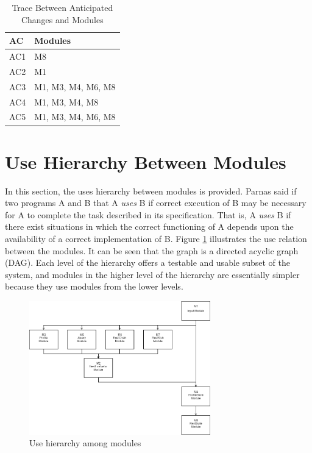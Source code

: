 \documentclass[12pt, titlepage]{article}
\begin{document}
\begin{table}[H]
\centering
\begin{tabular}{p{} p{}}
\toprule
\textbf{AC} & \textbf{Modules}\\
\midrule
AC1 & M8\\
AC2 & M1\\
AC3 & M1, M3, M4, M6, M8\\
AC4 & M1, M3, M4, M8\\
AC5 & M1, M3, M4, M6, M8\\

\bottomrule
\end{tabular}
\caption{Trace Between Anticipated Changes and Modules}
\label{TblACT}
\end{table}


\section{Use Hierarchy Between Modules} \label{SecUse}

In this section, the uses hierarchy between modules is
provided. Parnas said if two programs A and B that A {\em uses} B if
correct execution of B may be necessary for A to complete the task described in
its specification. That is, A {\em uses} B if there exist situations in which
the correct functioning of A depends upon the availability of a correct
implementation of B.  Figure \ref{FigUH} illustrates the use relation between
the modules. It can be seen that the graph is a directed acyclic graph
(DAG). Each level of the hierarchy offers a testable and usable subset of the
system, and modules in the higher level of the hierarchy are essentially simpler because they use modules from the lower levels.

\begin{figure}[H]
\centering
\includegraphics[width=0.7\textwidth]{UsesHierarchy.png}
\caption{Use hierarchy among modules}
\label{FigUH}
\end{figure}
\end{document}
